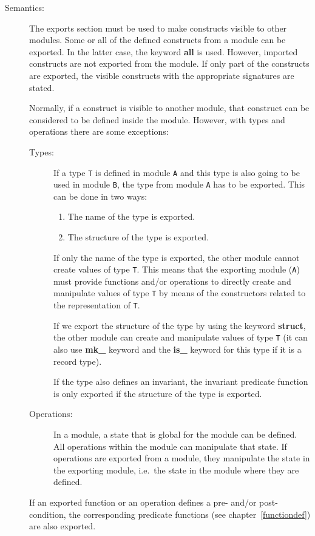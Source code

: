 \documentclass{overturerepchap}
\newcommand{\keyw}[1]{{\bf\ttfamily #1}}
\begin{document}
\begin{description}
\item[Semantics:] The exports section must be used to make constructs
  visible to other modules. Some or all of the defined
  constructs from a module can be exported. In the latter case, the keyword
  \keyw{all} is used. However, imported constructs are not exported
  from the module. If only part 
  of the constructs are exported, the visible constructs with
  the appropriate signatures are stated.

  Normally, if a construct is visible to another module,
  that construct can be considered
   to be defined inside the module. However, with types and
  operations there are some exceptions:
  \begin{description}
  \item[Types:] If a type {\tt T} is defined in module {\tt A} and
    this type is also going to be used in module {\tt B}, the type
    from module {\tt A} has to be exported. This can be done in two ways:
    \begin{enumerate}
    \item The name of the type is exported.
    \item The structure of the type is exported.
    \end{enumerate}
    If only the name of the type is exported, the other module cannot create
    values of type {\tt T}. This means that the exporting module ({\tt A})
    must provide functions and/or operations to directly create and manipulate
    values of type {\tt T} by means of the constructors related to the
    representation of {\tt T}. 

    If we export the structure of the type by using the keyword
    \keyw{struct}, the other module can create and manipulate values of
    type {\tt T} (it can also use \keyw{mk\_} keyword and the
    \keyw{is\_} keyword for this type if it is a record type).

    If the type also defines an invariant, the invariant predicate function
    is only exported if the structure of the type is exported.

  \item[Operations:] In a module, a state that is global for
    the module can be defined. All operations within the module can
    manipulate that state. If operations are exported from a module, they
     manipulate the state in the exporting module,
      i.e.\ the state in the module where they are defined.
  \end{description}

  If an exported function or an operation defines a pre- and/or
  post-condition, the corresponding predicate functions (see
  chapter~\ref{functiondef}) are also exported.


\end{description}
\end{document}
